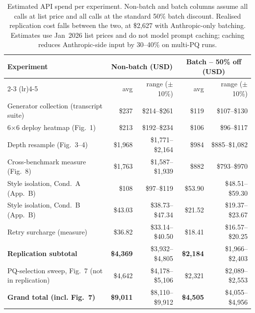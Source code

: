 \documentclass{article}
\begin{document}
\begin{table}[h]
\centering
\small
\begin{tabular}{@{}lrrrr@{}}
\toprule
Experiment & \multicolumn{2}{c}{Non-batch (USD)} & \multicolumn{2}{c}{Batch -- 50\% off (USD)} \\
\cmidrule(lr){2-3} \cmidrule(lr){4-5}
 & avg & range ($\pm$10\%) & avg & range ($\pm$10\%) \\
\midrule
Generator collection (transcript suite)       & \$237   & \$214--\$261     & \$119   & \$107--\$130 \\
6$\times$6 deploy heatmap (Fig.~1)            & \$213   & \$192--\$234     & \$106   & \$96--\$117 \\
Depth resample (Fig.~3--4)                    & \$1{,}968 & \$1{,}771--\$2{,}164 & \$984 & \$885--\$1{,}082 \\
Cross-benchmark measure (Fig.~8)              & \$1{,}763 & \$1{,}587--\$1{,}939 & \$882 & \$793--\$970 \\
Style isolation, Cond.~A (App.~B)             & \$108   & \$97--\$119      & \$53.90 & \$48.51--\$59.30 \\
Style isolation, Cond.~B (App.~B)             & \$43.03 & \$38.73--\$47.34 & \$21.52 & \$19.37--\$23.67 \\
Retry surcharge (measure)                     & \$36.82 & \$33.14--\$40.50 & \$18.41 & \$16.57--\$20.25 \\
\midrule
\textbf{Replication subtotal}                 & \textbf{\$4{,}369} & \$3{,}932--\$4{,}805 & \textbf{\$2{,}184} & \$1{,}966--\$2{,}403 \\
\midrule
PQ-selection sweep, Fig.~7 (not in replication)
                                              & \$4{,}642 & \$4{,}178--\$5{,}106 & \$2{,}321 & \$2{,}089--\$2{,}553 \\
\midrule
\textbf{Grand total (incl. Fig.~7)}           & \textbf{\$9{,}011} & \$8{,}110--\$9{,}912 & \textbf{\$4{,}505} & \$4{,}055--\$4{,}956 \\
\bottomrule
\end{tabular}
\caption{Estimated API spend per experiment. Non-batch and batch
columns assume all calls at list price and all calls at the standard
50\% batch discount. Realised replication cost falls between the two,
at \$2{,}627 with Anthropic-only batching. Estimates use Jan~2026 list
prices and do not model prompt caching; caching reduces Anthropic-side
input by 30--40\% on multi-PQ runs.}
\label{tab:appendix_cost}
\end{table}

\newpage
% 
\end{document}
